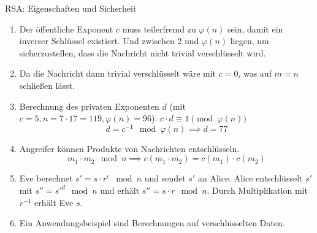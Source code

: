 \documentclass{article}
\begin{document}
\begin{exercise}{RSA: Eigenschaften und Sicherheit}
  \begin{solution}
    \begin{enumerate}
        \item Der öffentliche Exponent $c$ muss teilerfremd zu $\varphi(n)$ sein, damit ein inverser Schlüssel existiert. Und zwischen 2 und $\varphi(n)$ liegen, um sicherzustellen, dass die Nachricht nicht trivial verschlüsselt wird.
        \item Da die Nachricht dann trivial verschlüsselt wäre mit $c = 0$, was auf $m=n$ schließen lässt.
        \item Berechnung des privaten Exponenten $d$ (mit $c = 5, n = 7 \cdot 17 = 119, \varphi(n) = 96$): $c \cdot d \equiv 1 \pmod{\varphi(n)}$
          \[ d = c^{-1} \mod \varphi(n) \implies d = 77 \]
        \item Angreifer können Produkte von Nachrichten entschlüsseln.
          \[ m_1 \cdot m_2 \mod n \implies c(m_1 \cdot m_2) = c(m_1) \cdot c(m_2) \]
        \item Eve berechnet $s'=s \cdot r^c \mod{n}$ und sendet $s'$ an Alice. Alice entschlüsselt $s'$ mit $s''=s'^d \mod{n}$ und erhält $s''=s \cdot r \mod{n}$. Durch Multiplikation mit $r^{-1}$ erhält Eve $s$.
        \item Ein Anwendungsbeispiel sind Berechnungen auf verschlüsselten Daten.
    \end{enumerate}
  \end{solution}
\end{exercise}
\end{document}
